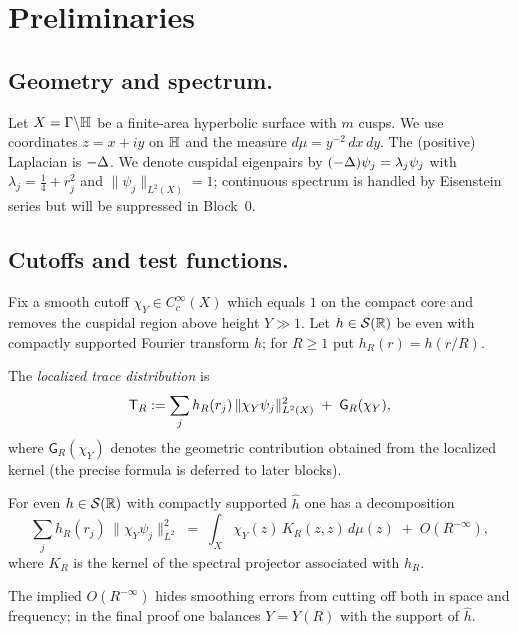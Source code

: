 \section{Preliminaries}\label{sec:prelim}

\subsection{Geometry and spectrum.}
Let $X=\Gamma\backslash\mathbb{H}$ be a finite-area hyperbolic surface with $m$
cusps. We use coordinates $z=x+iy$ on $\mathbb{H}$ and the measure
$d\mu=y^{-2}\,dx\,dy$. The (positive) Laplacian is $-\Delta$.
We denote cuspidal eigenpairs by $(-\Delta)\psi_j=\lambda_j\psi_j$ with
$\lambda_j=\tfrac14+r_j^2$ and $\|\psi_j\|_{L^2(X)}=1$; continuous spectrum
is handled by Eisenstein series but will be suppressed in Block~0.

\subsection{Cutoffs and test functions.}
Fix a smooth cutoff $\chi_Y\in C_c^\infty(X)$ which equals $1$ on the
compact core and removes the cuspidal region above height $Y\gg1$.
Let $h\in\mathcal{S}(\mathbb{R})$ be even with compactly supported Fourier
transform $\widehat{h}$; for $R\ge1$ put $h_R(r)=h(r/R)$.

\begin{definition}
The \emph{localized trace distribution} is
\[
  \mathsf{T}_R := \sum_j h_R(r_j)\,\|\chi_Y\psi_j\|_{L^2(X)}^2
  \;+\; \mathsf{G}_R(\chi_Y),
\]
where $\mathsf{G}_R(\chi_Y)$ denotes the geometric contribution obtained
from the localized kernel (the precise formula is deferred to later blocks).
\end{definition}

\begin{lemma}\label{lem:planch}
For even $h\in\mathcal{S}(\mathbb{R})$ with compactly supported $\widehat{h}$ one
has a decomposition
\[
  \sum_j h_R(r_j)\,\|\chi_Y\psi_j\|_{L^2}^2
  \;=\; \int_X \chi_Y(z)\,K_R(z,z)\,d\mu(z) \;+\; O(R^{-\infty}),
\]
where $K_R$ is the kernel of the spectral projector associated with $h_R$.
\end{lemma}

\begin{remark}
The implied $O(R^{-\infty})$ hides smoothing errors from cutting off both
in space and frequency; in the final proof one balances $Y=Y(R)$ with the
support of $\widehat{h}$.
\end{remark}
